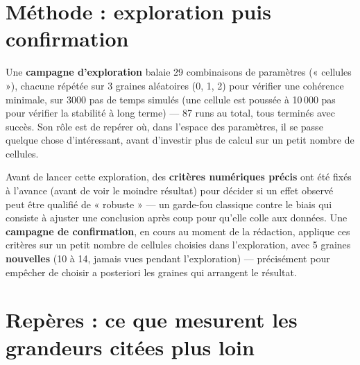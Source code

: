 \documentclass[11pt,a4paper]{article}
\begin{document}
\section{Méthode : exploration puis confirmation}

Une \textbf{campagne d'exploration} balaie 29 combinaisons de
paramètres (« cellules »), chacune répétée sur 3 graines aléatoires (0,
1, 2) pour vérifier une cohérence minimale, sur 3000 pas de temps
simulés (une cellule est poussée à 10\,000 pas pour vérifier la
stabilité à long terme) --- 87 runs au total, tous terminés avec
succès. Son rôle est de repérer où, dans l'espace des paramètres, il se
passe quelque chose d'intéressant, avant d'investir plus de calcul sur
un petit nombre de cellules.

Avant de lancer cette exploration, des \textbf{critères numériques
précis} ont été fixés à l'avance (avant de voir le moindre résultat)
pour décider si un effet observé peut être qualifié de « robuste » ---
un garde-fou classique contre le biais qui consiste à ajuster une
conclusion après coup pour qu'elle colle aux données. Une
\textbf{campagne de confirmation}, en cours au moment de la rédaction,
applique ces critères sur un petit nombre de cellules choisies dans
l'exploration, avec 5 graines \textbf{nouvelles} (10 à 14, jamais vues
pendant l'exploration) --- précisément pour empêcher de choisir a
posteriori les graines qui arrangent le résultat.

\section{Repères : ce que mesurent les grandeurs citées plus loin}
\label{sec:reperes}
\end{document}
